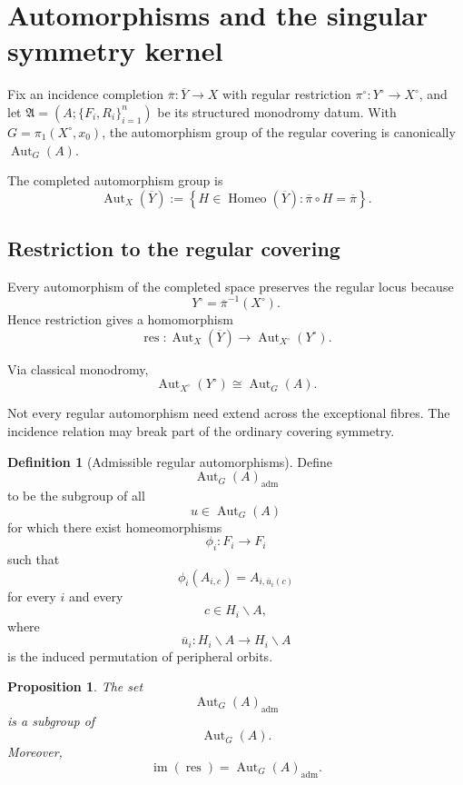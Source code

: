 \documentclass[11pt]{article}
\theoremstyle{plain}
\newtheorem{proposition}[theorem]{Proposition}
\theoremstyle{definition}
\newtheorem{definition}[theorem]{Definition}
\begin{document}
\section{Automorphisms and the singular symmetry kernel}
\label{sec:singular-automorphisms}

Fix an incidence completion $\overline\pi:\overline Y\to X$ with regular
restriction $\pi^\circ:Y^\circ\to X^\circ$, and let
$\mathfrak A=(A;\{F_i,R_i\}_{i=1}^n)$ be its structured monodromy datum.  With
$G=\pi_1(X^\circ,x_0)$, the automorphism group of the regular covering is
canonically $\operatorname{Aut}_G(A)$.

The completed automorphism group is
\[
\operatorname{Aut}_X(\overline Y)
:=
\left\{
H\in\operatorname{Homeo}(\overline Y):
\overline\pi\circ H=\overline\pi
\right\}.
\]

\subsection{Restriction to the regular covering}
\label{subsec:restriction-regular}

Every automorphism of the completed space preserves the regular locus
because
\[
Y^\circ
=
\overline\pi^{-1}(X^\circ).
\]
Hence restriction gives a homomorphism
\[
\operatorname{res}:
\operatorname{Aut}_X(\overline Y)
\longrightarrow
\operatorname{Aut}_{X^\circ}(Y^\circ).
\]

Via classical monodromy,
\[
\operatorname{Aut}_{X^\circ}(Y^\circ)
\cong
\operatorname{Aut}_G(A).
\]

Not every regular automorphism need extend across the exceptional fibres.
The incidence relation may break part of the ordinary covering symmetry.

\begin{definition}[Admissible regular automorphisms]
\label{def:admissible-regular-aut}
Define
\[
\operatorname{Aut}_G(A)_{\mathrm{adm}}
\]
to be the subgroup of all
\[
u\in\operatorname{Aut}_G(A)
\]
for which there exist homeomorphisms
\[
\phi_i:F_i\longrightarrow F_i
\]
such that
\[
\phi_i(A_{i,c})
=
A_{i,\overline u_i(c)}
\]
for every $i$ and every
\[
c\in H_i\backslash A,
\]
where
\[
\overline u_i:
H_i\backslash A
\longrightarrow
H_i\backslash A
\]
is the induced permutation of peripheral orbits.
\end{definition}

\begin{proposition}
\label{prop:admissible-subgroup}
The set
\[
\operatorname{Aut}_G(A)_{\mathrm{adm}}
\]
is a subgroup of
\[
\operatorname{Aut}_G(A).
\]
Moreover,
\[
\operatorname{im}(\operatorname{res})
=
\operatorname{Aut}_G(A)_{\mathrm{adm}}.
\]
\end{proposition}
\end{document}
